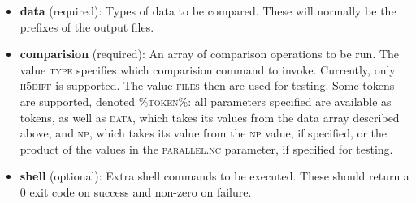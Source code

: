 \documentclass{article}
\begin{document}
\begin{itemize}
\begin{itemize}
\item \textbf{data} (required): Types of data to be compared. These will normally be the prefixes of the output files.
\item \textbf{comparision} (required): An array of comparison operations to be run. The value \textsc{type} specifies which comparision command to invoke. Currently, only \textsc{h5diff} is supported. The value \textsc{files} then are used for testing. Some tokens are supported, denoted \textsc{\%token\%}: all parameters specified are available as tokens, as well as \textsc{data}, which takes its values from the data array described above, and \textsc{np}, which takes its value from the \textsc{np} value, if specified, or the product of the values in the \textsc{parallel.nc} parameter, if specified for testing.
\item \textbf{shell} (optional): Extra shell commands to be executed. These should return a 0 exit code on success and non-zero on failure.
\end{itemize}
\end{itemize}
\end{document}
